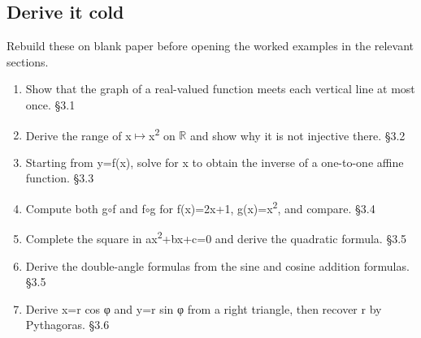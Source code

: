 \documentclass[11pt]{article}
\begin{document}
\begin{keepsection}
\section{Derive it cold}

Rebuild these on blank paper before opening the worked examples in the relevant sections.

\begin{enumerate}
\item Show that the graph of a real-valued function meets each vertical line at most once. \hfill{\small\color{FAUblue}§3.1}
\item Derive the range of x\ensuremath{\mapsto}x\textsuperscript{2} on \ensuremath{\mathbb{R}} and show why it is not injective there. \hfill{\small\color{FAUblue}§3.2}
\item Starting from y=f(x), solve for x to obtain the inverse of a one-to-one affine function. \hfill{\small\color{FAUblue}§3.3}
\item Compute both g\ensuremath{\circ}f and f\ensuremath{\circ}g for f(x)=2x+1, g(x)=x\textsuperscript{2}, and compare. \hfill{\small\color{FAUblue}§3.4}
\item Complete the square in ax\textsuperscript{2}+bx+c=0 and derive the quadratic formula. \hfill{\small\color{FAUblue}§3.5}
\item Derive the double-angle formulas from the sine and cosine addition formulas. \hfill{\small\color{FAUblue}§3.5}
\item Derive x=r cos φ and y=r sin φ from a right triangle, then recover r by Pythagoras. \hfill{\small\color{FAUblue}§3.6}
\end{enumerate}
\end{keepsection}
\end{document}
